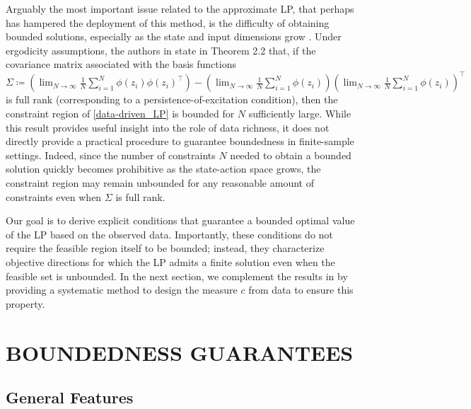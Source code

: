 \documentclass[journal,twoside,web]{ieeecolor}
\newcommand{\review}{\color{black}}
\begin{document}
Arguably the most important issue related to the approximate LP, that perhaps has hampered the deployment of this method, is the difficulty of obtaining bounded solutions, especially as the state and input dimensions grow \cite{RelaxedBellmanOp,LuciaBounded}.
Under ergodicity assumptions, the authors in \cite{CDC22_meyn} state in Theorem 2.2 that, if the covariance matrix associated with the basis functions $\Sigma \coloneq  ( \lim_{N \to \infty} \frac{1}{N} \sum_{i=1}^{N} \phi(z_i) \phi(z_i)^\top ) - ( \lim_{N \to \infty} \frac{1}{N} \sum_{i=1}^{N} \phi(z_i) ) ( \lim_{N \to \infty} \frac{1}{N} \sum_{i=1}^{N} \phi(z_i) )^\top$ is full rank (corresponding to a persistence-of-excitation condition), then the constraint region of \eqref{data-driven_LP} is bounded for $N$ sufficiently large.
While this result provides useful insight into the role of data richness, it does not directly provide a practical procedure to guarantee boundedness in finite-sample settings. Indeed, {\review since the number of constraints $N$ needed to obtain a bounded solution quickly becomes prohibitive as the state-action space grows, the constraint region may remain unbounded for any reasonable amount of constraints even when $\Sigma$ is full rank.}

Our goal is to derive explicit conditions that guarantee a bounded optimal value of the LP based on the observed data. Importantly, these conditions do not require the feasible region itself to be bounded; instead, they characterize objective directions for which the LP admits a finite solution even when the feasible set is unbounded. In the next section, we complement the results in \cite{CDC22_meyn} by providing a systematic method to design the measure $c$ from data to ensure this property. 

\section{BOUNDEDNESS GUARANTEES}

\subsection{General Features}
\end{document}
